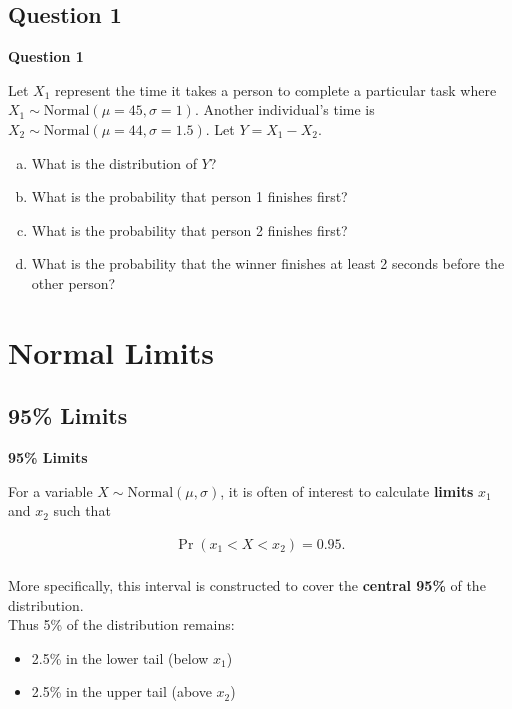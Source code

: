 \documentclass[compress]{beamer}        %
\makeatletter
\newcommand{\tcb}{\textcolor{beamer@blendedblue}}
\makeatother
\begin{document}
\subsection{Question 1}
\begin{frame}{\bf \tcb{Question 1}}

Let $X_1$ represent the time it takes a person to complete a particular task where $X_1 \sim \text{Normal}(\mu=45,\sigma=1)$. Another individual's time is $X_2 \sim \text{Normal}(\mu=44,\sigma=1.5)$. Let $Y = X_1 - X_2$.\\[0.2cm]

\begin{enumerate}[a)]\itemsep0.3cm
\item What is the distribution of $Y$?
\item What is the probability that person 1 finishes first?
\item What is the probability that person 2 finishes first?
\item What is the probability that the winner finishes at least 2 seconds before the other person?
\end{enumerate}


\end{frame}



\section{Normal Limits}
\subsection{95\% Limits}
\begin{frame}{\bf \tcb{95\% Limits}}

For a variable $X \sim \text{Normal}(\mu,\sigma)$, it is often of interest to calculate {\bf limits} $x_1$ and $x_2$ such that

\begin{align*}
\Pr(x_1 < X < x_2) = 0.95.\\
\end{align*}

More specifically, this interval is constructed to cover the {\bf central 95\%} of the distribution.\\[0.7cm]

Thus 5\% of the distribution remains:\\[0.1cm]
\begin{itemize}\itemsep0.3cm
\item 2.5\% in the lower tail (below $x_1$)
\item 2.5\% in the upper tail (above $x_2$)
\end{itemize}

\end{frame}
\end{document}
